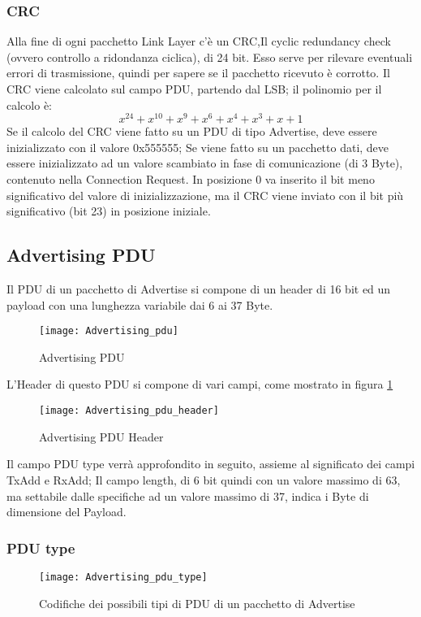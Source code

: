 \subsubsection{CRC}
Alla fine di ogni pacchetto Link Layer c'è un CRC,Il cyclic redundancy check (ovvero controllo a ridondanza ciclica), di 24 bit. Esso serve per rilevare eventuali errori di trasmissione, quindi per sapere se il pacchetto ricevuto è corrotto.
Il CRC viene calcolato sul campo PDU, partendo dal LSB; il polinomio per il calcolo è:
\[x^24 + x^10 + x^9 + x^6 + x^4 + x^3 + x + 1\] 
Se il calcolo del CRC viene fatto su un PDU di tipo Advertise, deve essere inizializzato con il valore 0x555555;
Se viene fatto su un pacchetto dati, deve essere inizializzato ad un valore scambiato in fase di comunicazione (di 3 Byte), contenuto nella Connection Request.
In posizione 0 va inserito il bit meno significativo del valore di inizializzazione, ma il CRC viene inviato con il bit più significativo (bit 23) in posizione iniziale.

\subsection{Advertising PDU}
Il PDU di un pacchetto di Advertise si compone di un header di 16 bit ed un payload con una lunghezza variabile dai 6 ai 37 Byte.

\begin{figure}[H]
\texttt{[image: Advertising\_pdu]}
\centering
\caption{Advertising PDU}
\end{figure}

\noindent L'Header di questo PDU si compone di vari campi, come mostrato in figura \ref{Advertising_pdu_header}

\begin{figure}[H]
\texttt{[image: Advertising\_pdu\_header]}
\centering
\caption{Advertising PDU Header}
\label{Advertising_pdu_header}
\end{figure}

Il campo PDU type verrà approfondito in seguito, assieme al significato dei campi TxAdd e RxAdd; Il campo length, di 6 bit quindi con un valore massimo di 63, ma settabile dalle specifiche ad un valore massimo di 37, indica i Byte di dimensione del Payload.


\subsubsection{PDU type}

\begin{figure}[H]
\texttt{[image: Advertising\_pdu\_type]}
\centering
\caption{Codifiche dei possibili tipi di PDU di un pacchetto di Advertise}
\end{figure}
 
